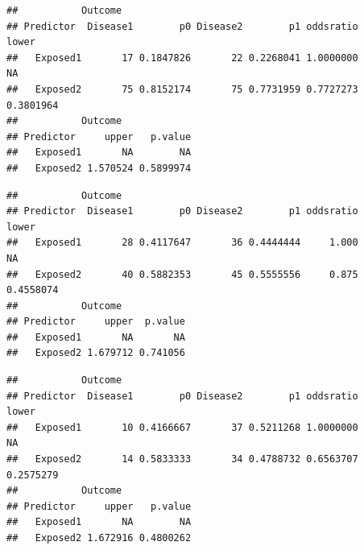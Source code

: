 \documentclass[]{article}
\newenvironment{Shaded}{\begin{snugshade}}{\end{snugshade}}
\newcommand{\KeywordTok}[1]{\textcolor[rgb]{0.13,0.29,0.53}{\textbf{#1}}}
\newcommand{\DecValTok}[1]{\textcolor[rgb]{0.00,0.00,0.81}{#1}}
\newcommand{\OperatorTok}[1]{\textcolor[rgb]{0.81,0.36,0.00}{\textbf{#1}}}
\newcommand{\NormalTok}[1]{#1}
\begin{document}
\begin{verbatim}
##           Outcome
## Predictor  Disease1        p0 Disease2        p1 oddsratio     lower
##   Exposed1       17 0.1847826       22 0.2268041 1.0000000        NA
##   Exposed2       75 0.8152174       75 0.7731959 0.7727273 0.3801964
##           Outcome
## Predictor     upper   p.value
##   Exposed1       NA        NA
##   Exposed2 1.570524 0.5899974
\end{verbatim}

\begin{Shaded}
\end{Shaded}

\begin{verbatim}
##           Outcome
## Predictor  Disease1        p0 Disease2        p1 oddsratio     lower
##   Exposed1       28 0.4117647       36 0.4444444     1.000        NA
##   Exposed2       40 0.5882353       45 0.5555556     0.875 0.4558074
##           Outcome
## Predictor     upper  p.value
##   Exposed1       NA       NA
##   Exposed2 1.679712 0.741056
\end{verbatim}

\begin{Shaded}
\end{Shaded}

\begin{verbatim}
##           Outcome
## Predictor  Disease1        p0 Disease2        p1 oddsratio     lower
##   Exposed1       10 0.4166667       37 0.5211268 1.0000000        NA
##   Exposed2       14 0.5833333       34 0.4788732 0.6563707 0.2575279
##           Outcome
## Predictor     upper   p.value
##   Exposed1       NA        NA
##   Exposed2 1.672916 0.4800262
\end{verbatim}

\begin{Shaded}
\end{Shaded}
\end{document}
